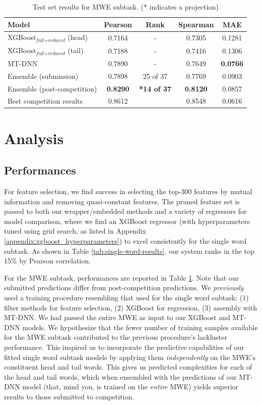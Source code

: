 \documentclass{dcthesis}
\theoremstyle{definition}
\theoremstyle{remark}
\begin{document}
\begin{table}[!htbp]
  \centering
  \begin{tabular}{l|cccc}
    \hline \textbf{Model} & \textbf{Pearson} & \textbf{Rank} & \textbf{Spearman} & \textbf{MAE} \\ \hline
    XGBoost$_{\textit{full}+\textit{reduced}}$ (head) & 0.7164 & - & 0.7305 & 0.1281 \\
    XGBoost$_{\textit{full}+\textit{reduced}}$ (tail) & 0.7188 & - & 0.7416 & 0.1306 \\
    MT-DNN & 0.7890 & - & 0.7649 & \textbf{0.0766} \\
    Ensemble (submission) & 0.7898 & 25 of 37 & 0.7769 & 0.0903 \\
    Ensemble (post-competition) & \textbf{0.8290} & \textbf{*14 of 37} & \textbf{0.8120} & 0.0857 \\
    \hline
    Best competition results & 0.8612 & &  0.8548 & 0.0616 \\ 
    \hline
  \end{tabular}
  \caption{\label{tab:multi-word-results} Test set results for MWE subtask. (* indicates a projection)}
\end{table}


\chapter{Analysis}

\section{Performances}

For feature selection, we find success in selecting the top-300 features by mutual information and removing quasi-constant features. The pruned feature set is passed to both our wrapper/embedded methods and a variety of regressors for model comparison, where we find an XGBoost regressor (with hyperparameters tuned using grid search, as listed in Appendix \ref{appendix:xgboost_hyperparameters}) to excel consistently for the single word subtask. As shown in Table \ref{tab:single-word-results}, our system ranks in the top 15\% by Pearson correlation.

For the MWE subtask, performances are reported in Table \ref{tab:multi-word-results}. Note that our submitted predictions differ from post-competition predictions. We \textit{previously} used a training procedure resembling that used for the single word subtask: (1) filter methods for feature selection, (2) XGBoost for regression, (3) assembly with MT-DNN. We had passed the entire MWE as input to our XGBoost and MT-DNN models. We hypothesize that the fewer number of training samples available for the MWE subtask contributed to the previous procedure's lackluster performance. This inspired us to incorporate the predictive capabilities of our fitted single word subtask models by applying them \textit{independently} on the MWE's constituent head and tail words. This gives us predicted complexities for each of the head and tail words, which when ensembled with the predictions of our MT-DNN model (that, mind you, is trained on the \textit{entire} MWE) yields superior results to those submitted to competition.
\end{document}
